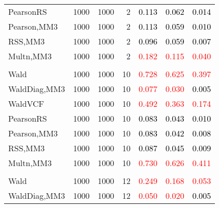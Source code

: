 \documentclass[
]{article}
\begin{document}
\begin{table}[H]
{\begin{tabular}[t]{lrrrrrr}
\hspace{1em}PearsonRS & 1000 & 1000 & 2 & \textcolor{black}{0.113} & \textcolor{black}{0.062} & \textcolor{black}{0.014}\\
\hspace{1em}Pearson,MM3 & 1000 & 1000 & 2 & \textcolor{black}{0.113} & \textcolor{black}{0.059} & \textcolor{black}{0.010}\\
\hspace{1em}RSS,MM3 & 1000 & 1000 & 2 & \textcolor{black}{0.096} & \textcolor{black}{0.059} & \textcolor{black}{0.007}\\
\hspace{1em}Multn,MM3 & 1000 & 1000 & 2 & \textcolor{red}{0.182} & \textcolor{red}{0.115} & \textcolor{red}{0.040}\\
\addlinespace[0.3em]
\multicolumn{7}{l}{\textbf{1F 15V}}\\
\hspace{1em}Wald & 1000 & 1000 & 10 & \textcolor{red}{0.728} & \textcolor{red}{0.625} & \textcolor{red}{0.397}\\
\hspace{1em}WaldDiag,MM3 & 1000 & 1000 & 10 & \textcolor{red}{0.077} & \textcolor{red}{0.030} & \textcolor{black}{0.005}\\
\hspace{1em}WaldVCF & 1000 & 1000 & 10 & \textcolor{red}{0.492} & \textcolor{red}{0.363} & \textcolor{red}{0.174}\\
\hspace{1em}PearsonRS & 1000 & 1000 & 10 & \textcolor{black}{0.083} & \textcolor{black}{0.043} & \textcolor{black}{0.010}\\
\hspace{1em}Pearson,MM3 & 1000 & 1000 & 10 & \textcolor{black}{0.083} & \textcolor{black}{0.042} & \textcolor{black}{0.008}\\
\hspace{1em}RSS,MM3 & 1000 & 1000 & 10 & \textcolor{black}{0.087} & \textcolor{black}{0.045} & \textcolor{black}{0.009}\\
\hspace{1em}Multn,MM3 & 1000 & 1000 & 10 & \textcolor{red}{0.730} & \textcolor{red}{0.626} & \textcolor{red}{0.411}\\
\addlinespace[0.3em]
\multicolumn{7}{l}{\textbf{2F 10V}}\\
\hspace{1em}Wald & 1000 & 1000 & 12 & \textcolor{red}{0.249} & \textcolor{red}{0.168} & \textcolor{red}{0.053}\\
\hspace{1em}WaldDiag,MM3 & 1000 & 1000 & 12 & \textcolor{red}{0.050} & \textcolor{red}{0.020} & \textcolor{black}{0.005}\\

\end{tabular}}
\end{table}
\end{document}
